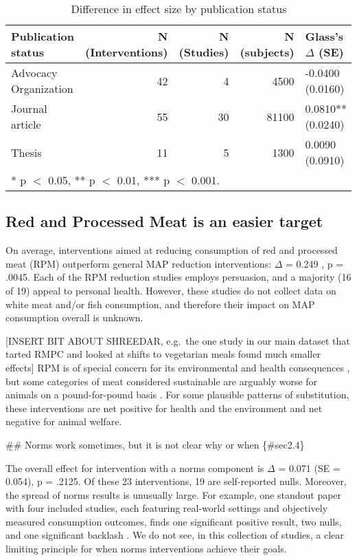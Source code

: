 \documentclass[sn-nature,pdflatex]{sn-jnl}
\begin{document}
\begin{table}[!h]
\centering
\caption{\label{tab:table_three}Difference in effect size by publication status}
\centering
\begin{tabular}[t]{lrrrl}
\toprule
Publication status & N (Interventions) & N (Studies) & N (subjects) & Glass's $\Delta$ (SE)\\
\midrule
Advocacy Organization & 42 & 4 & 4500 & -0.0400 (0.0160)\\
Journal article & 55 & 30 & 81100 & 0.0810** (0.0240)\\
Thesis & 11 & 5 & 1300 & 0.0090 (0.0910)\\
\bottomrule
\multicolumn{5}{l}{\rule{0pt}{1em}* p $<$ 0.05, ** p $<$ 0.01, *** p $<$ 0.001.}\\
\end{tabular}
\end{table}

\subsection{Red and Processed Meat is an easier target}\label{sec2.3}

On average, interventions aimed at reducing consumption of red and
processed meat (RPM) outperform general MAP reduction interventions:
\(\Delta\) = 0.249 , p = .0045. Each of the RPM
reduction studies employs persuasion, and a majority (16 of 19) appeal
to personal health. However, these studies do not collect data on white
meat and/or fish consumption, and therefore their impact on MAP
consumption overall is unknown.

{[}INSERT BIT ABOUT SHREEDAR, e.g.~the one study in our main dataset
that tarted RMPC and looked at shifts to vegetarian meals found much
smaller effects{]} RPM is of special concern for its environmental and
health consequences \citep{grummon2023}, but some categories of meat
considered sustainable are arguably worse for animals on a
pound-for-pound basis \citep{mathur2022ethical}. For some plausible
patterns of substitution, these interventions are net positive for
health and the environment and net negative for animal welfare.

\b \#\# Norms work sometimes, but it is not clear why or when
\{\#sec2.4\}

The overall effect for intervention with a norms component is \(\Delta\)
= 0.071 (SE = 0.054), p = .2125. Of these 23 interventions, 19 are
self-reported nulls. Moreover, the spread of norms results is unusually
large. For example, one standout paper with four included studies, each
featuring real-world settings and objectively measured consumption
outcomes, finds one significant positive result, two nulls, and one
significant backlash \citep{sparkman2020}. We do not see, in this
collection of studies, a clear limiting principle for when norms
interventions achieve their goals.
\end{document}
